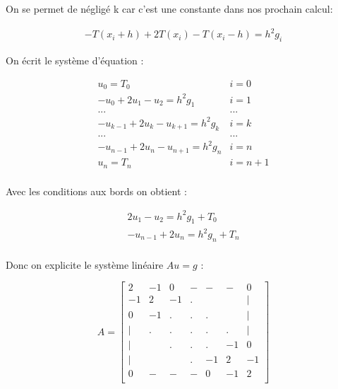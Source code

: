 \documentclass[11pt]{article}
\begin{document}
On se permet de négligé k car c'est une constante dans nos prochain calcul:

\begin{equation*}
  \begin{split}
    - T(x_i + h) + 2 T(x_i) - T(x_i - h) = h^2 g_i
  \end{split}
\end{equation*}

On écrit le système d'équation : 

\begin{equation*}
  \begin{array}{ll}
    u_0 = T_0 & i = 0 \\
    - u_0 + 2 u_1 - u_2 = h^2 g_1 & i = 1\\
    ... & ... \\
    - u_{k-1} + 2 u_k - u_{k+1} = h^2 g_k & i = k\\
    ... & ... \\
    - u_{n-1} + 2 u_n - u_{n+1} = h^2 g_n & i = n\\
    u_n = T_n & i = n + 1 \\
  \end{array}
\end{equation*}

Avec les conditions aux bords on obtient :

\begin{equation*}
  \begin{array}{l}
    2 u_1 - u_2 = h^2 g_1 + T_0 \\
    - u_{n-1} + 2 u_n = h^2 g_n + T_n \\
  \end{array}
\end{equation*}

Donc on explicite le système linéaire $Au = g$ :

\begin{equation*}
  A = \left[
    \begin{array}{ccccccc}
      2 & -1 & 0 & - & - & - & 0 \\
      -1 & 2 & -1 & . &  &  & |  \\
      0 & -1 & . & . & . &  & |  \\
      | & . & . & . & . & . & |  \\
      | & & . & . & . & -1 & 0  \\
      | & & & . & -1 & 2 & -1  \\
      0 & - & - & - & 0 & -1 & 2 \\
    \end{array}
    \right]
\end{equation*}
\end{document}

